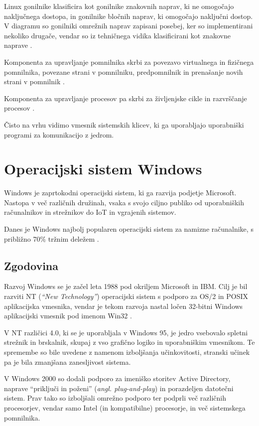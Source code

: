 \documentclass[a4paper,12pt,openright]{book}
\begin{document}
Linux gonilnike klasificira kot gonilnike znakovnih naprav, ki ne omogočajo naključnega dostopa, in gonilnike bločnih naprav, ki omogočajo naključni dostop.
V diagramu so gonilniki omrežnih naprav zapisani posebej, ker so implementirani nekoliko drugače, vendar so iz tehničnega vidika klasificirani kot znakovne naprave \cite{Tanenbaum_Bos_2023}.

Komponenta za upravljanje pomnilnika skrbi za povezavo virtualnega in fizičnega pomnilnika, povezane strani v pomnilniku, predpomnilnik in prenašanje novih strani v pomnilnik \cite{Tanenbaum_Bos_2023}.

Komponenta za upravljanje procesov pa skrbi za življenjske cikle in razvrščanje procesov \cite{Tanenbaum_Bos_2023}.

Čisto na vrhu vidimo vmesnik sistemskih klicev, ki ga uporabljajo uporabniški programi za komunikacijo z jedrom.

\section{Operacijski sistem Windows}

Windows je zaprtokodni operacijski sistem, ki ga razvija podjetje Microsoft.
Nastopa v več različnih družinah, vsaka s svojo ciljno publiko od uporabniških računalnikov in strežnikov do IoT in vgrajenih sistemov.

Danes je Windows najbolj popularen operacijski sistem za namizne raču\-nalnike, s približno 70\% tržnim deležem \cite{Statcounter_OS_2024}.

\subsection{Zgodovina}

Razvoj Windows se je začel leta 1988 pod okriljem Microsoft in IBM.
Cilj je bil razviti NT (\textit{``New Technology''}) operacijski sistem s podporo za OS/2 in POSIX aplikacijska vmesnika, vendar je tekom razvoja nastal ločen 32-bitni Windows aplikacijski vmesnik pod imenom Win32 \cite{Silberschatz_Galvin_Gagne_2018}.

V NT različici 4.0, ki se je uporabljala v Windows 95, je jedro vsebovalo spletni strežnik in brskalnik, skupaj z vso grafično logiko in uporabniškim vmesnikom.
Te spremembe so bile uvedene z namenom izboljšanja učinkovitosti, stranski učinek pa je bila zmanjšana zanesljivost sistema.

V Windows 2000 so dodali podporo za imeniško storitev Active Directory, naprave ``priključi in poženi'' (\textit{angl. plug-and-play}) in porazdeljen datotečni sistem.
Prav tako so izboljšali omrežno podporo ter podprli več različnih procesorjev, vendar samo Intel (in kompatibilne) procesorje, in več sistemskega pomnilnika.
\end{document}
